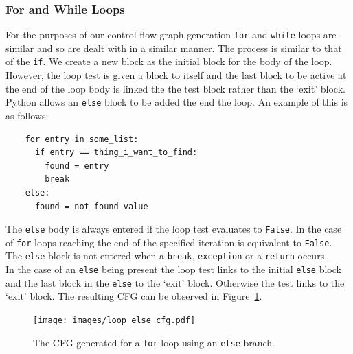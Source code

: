 \documentclass[12pt, titlepage]{article}
\begin{document}
\subsubsection{For and While Loops}
For the purposes of our control flow graph generation \texttt{for} and \texttt{while} loops are similar and so are dealt with in a similar manner. The process is similar to that of the \texttt{if}.  We create a new block as the initial block for the body of the loop. However, the loop test is given a block to itself and the last block to be active at the end of the loop body is linked the the test block rather than the `exit' block. \\
\indent Python allows an \texttt{else} block to be added the end the loop. An example of this is as follows:
\begin{lstlisting}
    for entry in some_list:
      if entry == thing_i_want_to_find:
        found = entry
        break
    else:
      found = not_found_value
\end{lstlisting}
The \texttt{else} body is always entered if the loop test evaluates to \texttt{False}. In the case of \texttt{for} loops reaching the end of the specified iteration is equivalent to \texttt{False}. The \texttt{else} block is not entered when a \texttt{break}, \texttt{exception} or a \texttt{return} occurs. \\
\indent In the case of an \texttt{else} being present the loop test links to the initial \texttt{else} block and the last block in the \texttt{else} to the `exit' block. Otherwise the test links to the `exit' block. The resulting CFG can be observed in Figure~\ref{fig:loopElseCFG}.

\begin{figure}
\centering
\texttt{[image: images/loop\_else\_cfg.pdf]}
\caption{The CFG generated for a \texttt{for} loop using an \texttt{else} branch.}
\label{fig:loopElseCFG}
\end{figure}
\end{document}
